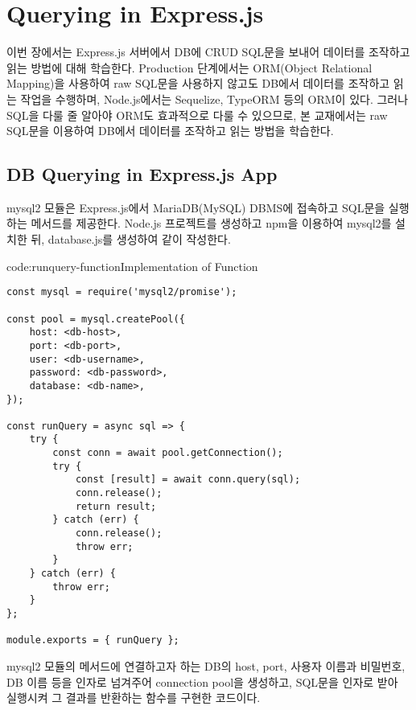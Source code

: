 \section{Querying in Express.js}\label{sect:querying-in-express-js}

이번 장에서는 Express.js 서버에서 DB에 CRUD SQL문을 보내어 데이터를 조작하고 읽는 방법에 대해 학습한다. Production 단계에서는 ORM(Object Relational Mapping)을 사용하여 raw SQL문을 사용하지 않고도 DB에서 데이터를 조작하고 읽는 작업을 수행하며, Node.js에서는 Sequelize, TypeORM 등의 ORM이 있다. 그러나 SQL을 다룰 줄 알아야 ORM도 효과적으로 다룰 수 있으므로, 본 교재에서는 raw SQL문을 이용하여 DB에서 데이터를 조작하고 읽는 방법을 학습한다.

\subsection*{DB Querying in Express.js App}

mysql2 모듈은 Express.js에서 MariaDB(MySQL) DBMS에 접속하고 SQL문을 실행하는 메서드를 제공한다. Node.js 프로젝트를 생성하고 npm을 이용하여 mysql2를 설치한 뒤, database.js를 생성하여 \과 같이 작성한다.

\begin{codeenv}{code:runquery-function}{Implementation of  Function}\begin{verbatim}
const mysql = require('mysql2/promise');

const pool = mysql.createPool({
    host: <db-host>,
    port: <db-port>,
    user: <db-username>,
    password: <db-password>,
    database: <db-name>,
});

const runQuery = async sql => {
    try {
        const conn = await pool.getConnection();
        try {
            const [result] = await conn.query(sql);
            conn.release();
            return result;
        } catch (err) {
            conn.release();
            throw err;
        }
    } catch (err) {
        throw err;
    }
};

module.exports = { runQuery };
\end{verbatim}
\end{codeenv}

\은 mysql2 모듈의  메서드에 연결하고자 하는 DB의 host, port, 사용자 이름과 비밀번호, DB 이름 등을 인자로 넘겨주어 connection pool을 생성하고, SQL문을 인자로 받아 실행시켜 그 결과를 반환하는  함수를 구현한 코드이다.

